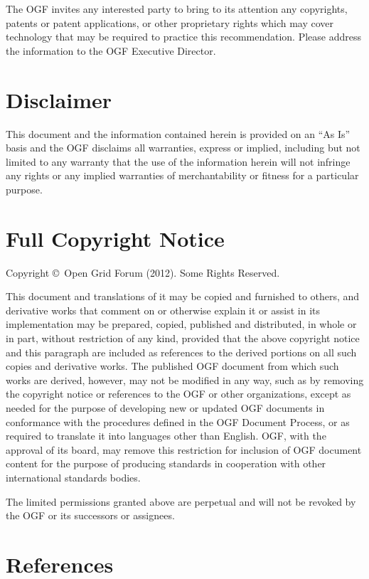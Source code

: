 \documentclass{article}
\newcommand{\copyrightyears}{2012}
\begin{document}
 The OGF invites any interested party to bring to its attention any
 copyrights, patents or patent applications, or other proprietary
 rights which may cover technology that may be required to practice
 this recommendation.  Please address the information to the OGF
 Executive Director.


\section{Disclaimer}

 This document and the information contained herein is provided on an
 ``As Is'' basis and the OGF disclaims all warranties, express or
 implied, including but not limited to any warranty that the use of
 the information herein will not infringe any rights or any implied
 warranties of merchantability or fitness for a particular purpose.


\section{Full Copyright Notice}

 Copyright \copyright \ Open Grid Forum (\copyrightyears). Some Rights
 Reserved.

 This document and translations of it may be copied and furnished to
 others, and derivative works that comment on or otherwise explain it
 or assist in its implementation may be prepared, copied, published
 and distributed, in whole or in part, without restriction of any
 kind, provided that the above copyright notice and this paragraph are
 included as references to the derived portions on all such copies and
 derivative works. The published OGF document from which such works
 are derived, however, may not be modified in any way, such as by
 removing the copyright notice or references to the OGF or other
 organizations, except as needed for the purpose of developing new or
 updated OGF documents in conformance with the procedures defined in
 the OGF Document Process, or as required to translate it into
 languages other than English. OGF, with the approval of its board,
 may remove this restriction for inclusion of OGF document content for
 the purpose of producing standards in cooperation with other
 international standards bodies. 

 The limited permissions granted above are perpetual and will not be
 revoked by the OGF or its successors or assignees. 


\section{References}
\renewcommand{\refname}{}
\vspace*{-3em}

\end{document}
